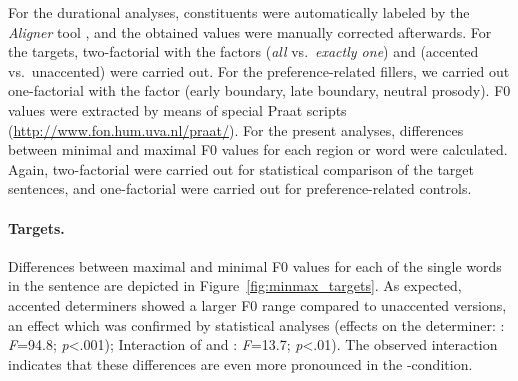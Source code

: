\documentclass[fleqn,reqno,10pt,draft]{article}
\newcommand{\as}{\acro{as}}
\begin{document}
For the durational analyses, constituents were automatically labeled
by the \emph{Aligner} tool \citep{Rapp98}, and the
obtained values were manually corrected afterwards. For the targets,
two-factorial  with the factors  (\emph{all}
vs.~\emph{exactly one}) and  (accented vs.~unaccented) were
carried out. For the preference-related fillers, we carried out
one-factorial  with the factor  (early
boundary, late boundary, neutral prosody). F0 values were extracted by
means of special Praat scripts
(\url{http://www.fon.hum.uva.nl/praat/}). For the present analyses,
differences between minimal and maximal F0 values for each region or
word were calculated. Again, two-factorial  were carried
out for statistical comparison of the target sentences, and one-factorial
 were carried out for preference-related controls.


\paragraph{Targets.} 
Differences between maximal and minimal F0 values for each of the
single words in the sentence are depicted in
Figure~\ref{fig:minmax_targets}. As expected, accented
determiners showed a larger F0 range compared to unaccented versions,
an effect which was confirmed by statistical analyses (effects on
the determiner: : \emph{F}=94.8; \emph{p}<.001); 
Interaction of  and : \emph{F}=13.7; 
\emph{p}<.01). The observed interaction indicates that these differences
are even more pronounced in the \as-condition.
\end{document}
